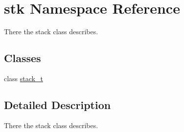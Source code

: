 \hypertarget{namespacestk}{}\section{stk Namespace Reference}
\label{namespacestk}


There the stack class describes.  


\subsection*{Classes}
\begin{DoxyCompactItemize}
\item 
class \hyperlink{classstk_1_1stack__t}{stack\+\_\+t}
\end{DoxyCompactItemize}


\subsection{Detailed Description}
There the stack class describes. 